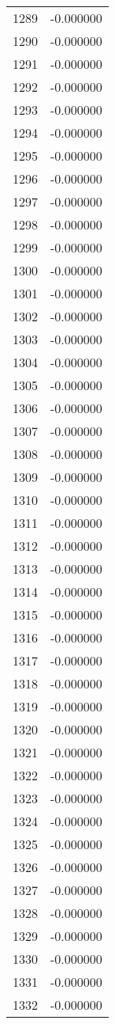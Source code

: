 \documentclass[12pt]{article}
\begin{document}
\begin{longtable}{@{}cc@{}}
1289 & -0.000000 \\
1290 & -0.000000 \\
1291 & -0.000000 \\
1292 & -0.000000 \\
1293 & -0.000000 \\
1294 & -0.000000 \\
1295 & -0.000000 \\
1296 & -0.000000 \\
1297 & -0.000000 \\
1298 & -0.000000 \\
1299 & -0.000000 \\
1300 & -0.000000 \\
1301 & -0.000000 \\
1302 & -0.000000 \\
1303 & -0.000000 \\
1304 & -0.000000 \\
1305 & -0.000000 \\
1306 & -0.000000 \\
1307 & -0.000000 \\
1308 & -0.000000 \\
1309 & -0.000000 \\
1310 & -0.000000 \\
1311 & -0.000000 \\
1312 & -0.000000 \\
1313 & -0.000000 \\
1314 & -0.000000 \\
1315 & -0.000000 \\
1316 & -0.000000 \\
1317 & -0.000000 \\
1318 & -0.000000 \\
1319 & -0.000000 \\
1320 & -0.000000 \\
1321 & -0.000000 \\
1322 & -0.000000 \\
1323 & -0.000000 \\
1324 & -0.000000 \\
1325 & -0.000000 \\
1326 & -0.000000 \\
1327 & -0.000000 \\
1328 & -0.000000 \\
1329 & -0.000000 \\
1330 & -0.000000 \\
1331 & -0.000000 \\
1332 & -0.000000 \\

\end{longtable}
\end{document}
